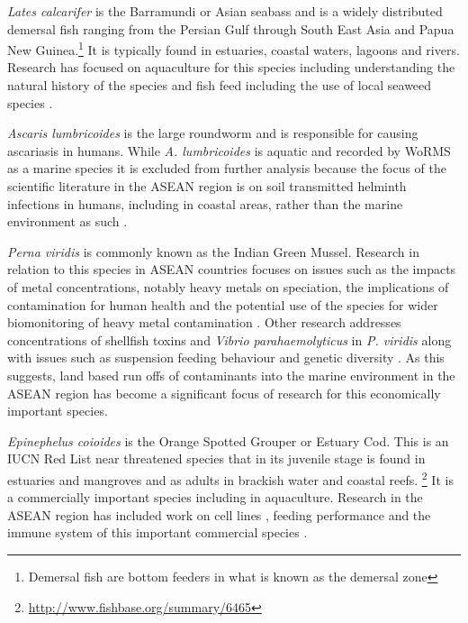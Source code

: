 \documentclass[]{book}
\theoremstyle{definition}
\theoremstyle{definition}
\theoremstyle{definition}
\theoremstyle{remark}
\begin{document}
\emph{Lates calcarifer} is the Barramundi or Asian seabass and is a
widely distributed demersal fish ranging from the Persian Gulf through
South East Asia and Papua New Guinea.\footnote{Demersal fish are bottom
  feeders in what is known as the demersal zone} It is typically found
in estuaries, coastal waters, lagoons and rivers. Research has focused
on aquaculture for this species including understanding the natural
history of the species \citep{Shadrin_2015} and fish feed
\citep{Shansudin_1997, Mohd_Yusof_2010} including the use of local
seaweed species \citep{Shapawi_2015}.

\emph{Ascaris lumbricoides} is the large roundworm and is responsible
for causing ascariasis in humans. While \emph{A. lumbricoides} is
aquatic and recorded by WoRMS as a marine species it is excluded from
further analysis because the focus of the scientific literature in the
ASEAN region is on soil transmitted helminth infections in humans,
including in coastal areas, rather than the marine environment as such
\citep{Montresor_2007}.

\emph{Perna viridis} is commonly known as the Indian Green Mussel.
Research in relation to this species in ASEAN countries focuses on
issues such as the impacts of metal concentrations, notably heavy metals
on speciation, the implications of contamination for human health and
the potential use of the species for wider biomonitoring of heavy metal
contamination \citep{Yap_2002, Yap_2004, Yap_2003}. Other research
addresses concentrations of shellfish toxins and \emph{Vibrio
parahaemolyticus} in \emph{P. viridis} \citep{Marasigan_2001} along with
issues such as suspension feeding behaviour
\citep{Hawkins_1998, Tan_2016} and genetic diversity \citep{Ye_2015}. As
this suggests, land based run offs of contaminants into the marine
environment in the ASEAN region has become a significant focus of
research for this economically important species.

\emph{Epinephelus coioides} is the Orange Spotted Grouper or Estuary
Cod. This is an IUCN Red List near threatened species that in its
juvenile stage is found in estuaries and mangroves and as adults in
brackish water and coastal reefs. \footnote{\url{http://www.fishbase.org/summary/6465}}
It is a commercially important species including in aquaculture.
Research in the ASEAN region has included work on cell lines
\citep{Qin_2006}, feeding performance \citep{Doi_1997, Eusebio_2004} and
the immune system of this important commercial species
\citep{Zhou_2011, Guo_2012}.
\end{document}

